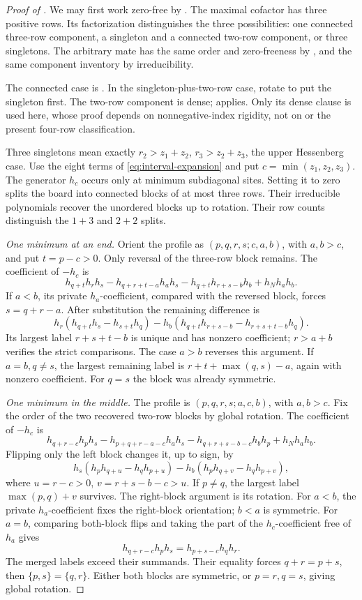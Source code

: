 \documentclass[11pt,a4paper]{amsart}
\numberwithin{equation}{section}
\theoremstyle{plain}
\theoremstyle{definition}
\begin{document}
\begin{proof}[Proof of ]
We may first work zero-free by .  The maximal
cofactor has three positive rows.  Its factorization distinguishes the
three possibilities: one connected three-row component, a singleton
and a connected two-row component, or three singletons.
The arbitrary mate has the same order and zero-freeness by
, and the same component inventory by irreducibility.

The connected case is .  In the
singleton-plus-two-row case, rotate to put the singleton first.  The
two-row component is dense;  applies.
Only its dense clause is used here, whose proof depends on
nonnegative-index rigidity, not on  or the
present four-row classification.

Three singletons mean exactly
\(r_2>z_1+z_2\), \(r_3>z_2+z_3\), the upper Hessenberg case.
Use the eight terms of \eqref{eq:interval-expansion} and put
\(c=\min(z_1,z_2,z_3)\).  The generator \(h_c\) occurs only at minimum
subdiagonal sites.  Setting it to zero splits the board into connected
blocks of at most three rows.  Their irreducible polynomials recover the
unordered blocks up to rotation.  Their row counts distinguish the
\(1+3\) and \(2+2\) splits.

\emph{One minimum at an end.}
Orient the profile as \((p,q,r,s;c,a,b)\), with \(a,b>c\), and put
\(t=p-c>0\).  Only reversal of the three-row block remains.
The coefficient of \(-h_c\) is
\[
 h_{q+t}h_rh_s-h_{q+r+t-a}h_ah_s
 -h_{q+t}h_{r+s-b}h_b+h_Nh_ah_b.
\]
If \(a<b\), its private \(h_a\)-coefficient, compared with the reversed
block, forces \(s=q+r-a\).  After substitution the remaining difference is
\[
 h_r(h_{q+t}h_s-h_{s+t}h_q)
 -h_b(h_{q+t}h_{r+s-b}-h_{r+s+t-b}h_q).
\]
Its largest label \(r+s+t-b\) is unique and has nonzero coefficient;
\(r>a+b\) verifies the strict comparisons.  The case \(a>b\) reverses
this argument.  If \(a=b,q\ne s\), the largest remaining label is
\(r+t+\max(q,s)-a\), again with nonzero coefficient.  For \(q=s\)
the block was already symmetric.

\emph{One minimum in the middle.}
The profile is \((p,q,r,s;a,c,b)\), with \(a,b>c\).
Fix the order of the two recovered two-row blocks by global rotation.
The coefficient of \(-h_c\) is
\[
 h_{q+r-c}h_ph_s-h_{p+q+r-a-c}h_ah_s
 -h_{q+r+s-b-c}h_bh_p+h_Nh_ah_b.
\]
Flipping only the left block changes it, up to sign, by
\[
 h_s(h_ph_{q+u}-h_qh_{p+u})
 -h_b(h_ph_{q+v}-h_qh_{p+v}),
\]
where \(u=r-c>0\), \(v=r+s-b-c>u\).
If \(p\ne q\), the largest label \(\max(p,q)+v\) survives.
The right-block argument is its rotation.
For \(a<b\), the private \(h_a\)-coefficient fixes the right-block
orientation; \(b<a\) is symmetric.  For \(a=b\), comparing both-block
flips and taking the part of the \(h_c\)-coefficient free of \(h_a\)
gives
\[
 h_{q+r-c}h_ph_s=h_{p+s-c}h_qh_r.
\]
The merged labels exceed their summands.  Their equality forces
\(q+r=p+s\), then \(\{p,s\}=\{q,r\}\).  Either both blocks are
symmetric, or \(p=r,q=s\), giving global rotation.


\end{proof}
\end{document}
